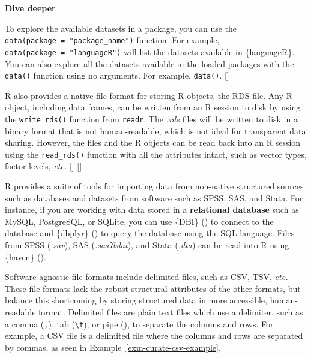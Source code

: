 \documentclass[
  letterpaper,
  krantz1]{latex/krantz-mod}
\newcommand{\cindex}[1]{%
  \StrSubstitute{#1}{_}{\_}[\temp]%
  \index{\temp}%
}
\theoremstyle{definition}
\theoremstyle{definition}
\theoremstyle{remark}
\begin{document}
\begin{tcolorbox}[enhanced jigsaw, toprule=.15mm, breakable, colback=white, arc=.35mm, left=2mm, colframe=quarto-callout-color-frame, opacityback=0, bottomrule=.15mm, rightrule=.15mm, leftrule=.75mm]

\textbf{ Dive deeper}

To explore the available datasets in a package, you can use the
\texttt{data(package\ =\ "package\_name")} function. For example,
\texttt{data(package\ =\ "languageR")} will list the datasets available
in \{languageR\}. You can also explore all the datasets available in the
loaded packages with the \texttt{data()} function using no arguments.
For example, \texttt{data()}.\cindex{data()}

\end{tcolorbox}

R also provides a native file format for storing R objects, the RDS
file. Any R object, including data
frames, can be written from an R session to disk by using the
\texttt{write\_rds()} function from \texttt{readr}. The \emph{.rds}
files will be written to disk in a binary format that is not
human-readable, which is not ideal for transparent data sharing.
However, the files and the R objects can be read back into an R session
using the \texttt{read\_rds()} function with all the attributes intact,
such as vector types, factor levels,
\emph{etc.}\cindex{write_rds()}\cindex{read_rds()}

R provides a suite of tools for importing data from non-native
structured sources such as databases and datasets from software such as
SPSS, SAS, and Stata. For instance, if you are working with data stored
in a \textbf{relational database} such as
MySQL, PostgreSQL, or SQLite, you can use \{DBI\}
() to connect to the database and \{dbplyr\}
() to query the
database using the SQL language. Files from SPSS (\emph{.sav}), SAS
(\emph{.sas7bdat}), and Stata (\emph{.dta}) can be read into R using
\{haven\} ().

Software agnostic file formats include delimited files, such as CSV,
TSV, \emph{etc.} These file formats
lack the robust structural attributes of the other formats, but balance
this shortcoming by storing structured data in more accessible,
human-readable format. Delimited files are plain text files which use a
delimiter, such as a comma (\texttt{,}), tab
(\texttt{\textbackslash{}t}), or pipe (\texttt{\textbar{}}), to separate
the columns and rows. For example, a CSV file is a delimited file where
the columns and rows are separated by commas, as seen in
Example~\ref{exm-curate-csv-example}.
\end{document}
